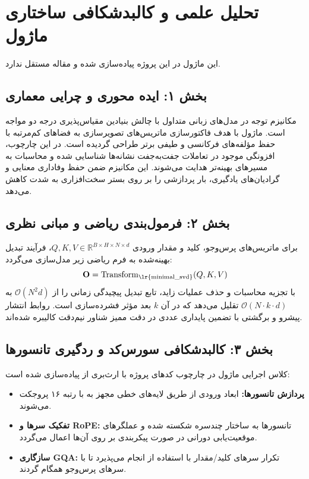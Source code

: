 \section{تحلیل علمی و کالبدشکافی ساختاری ماژول }

این ماژول در این پروژه پیاده‌سازی شده و مقاله مستقل ندارد.
\label{sec:minimal_svd}

\subsection*{بخش ۱: ایده محوری و چرایی معماری }
مکانیزم توجه در مدل‌های زبانی متداول با چالش بنیادین مقیاس‌پذیری درجه دو مواجه است. ماژول  با هدف فاکتورسازی ماتریس‌های تصویرسازی به فضاهای کم‌مرتبه با حفظ مؤلفه‌های فرکانسی و طیفی برتر طراحی گردیده است. در این چارچوب، افزونگی موجود در تعاملات جفت‌به‌جفت نشانه‌ها شناسایی شده و محاسبات به مسیرهای بهینه‌تر هدایت می‌شوند. این مکانیزم ضمن حفظ وفاداری معنایی و گرادیان‌های یادگیری، بار پردازشی را بر روی بستر سخت‌افزاری به شدت کاهش می‌دهد.

\subsection*{بخش ۲: فرمول‌بندی ریاضی و مبانی نظری }
برای ماتریس‌های پرس‌وجو، کلید و مقدار ورودی $Q, K, V \in \mathbb{R}^{B \times H \times N \times d}$، فرآیند تبدیل بهینه‌شده به فرم ریاضی زیر مدل‌سازی می‌گردد:
\begin{equation}
\mathbf{O} = \operatorname{Transform}_{\text{\lr{minimal\_svd}}}(Q, K, V)
\end{equation}
با تجزیه محاسبات و حذف عملیات زاید، تابع تبدیل پیچیدگی زمانی را از $\mathcal{O}(N^2 d)$ به $\mathcal{O}(N \cdot k \cdot d)$ تقلیل می‌دهد که در آن $k$ بعد مؤثر فشرده‌سازی است. روابط انتشار پیشرو و برگشتی با تضمین پایداری عددی در دقت ممیز شناور نیم‌دقت  کالیبره شده‌اند.

\subsection*{بخش ۳: کالبدشکافی سورس‌کد و ردگیری تانسورها }
کلاس اجرایی ماژول در چارچوب کدهای پروژه با ارث‌بری از  پیاده‌سازی شده است:
\begin{itemize}
    \item \textbf{پردازش تانسورها:} ابعاد ورودی \lr{$[B, N, D]$} از طریق لایه‌های خطی مجهز به  با رتبه ۱۶ پروجکت می‌شوند.
    \item \textbf{تفکیک سرها و RoPE:} تانسورها به ساختار چندسره \lr{$[B, H, N, d]$} شکسته شده و عملگرهای موقعیت‌یابی دورانی در صورت پیکربندی بر روی آن‌ها اعمال می‌گردد.
    \item \textbf{سازگاری GQA:} تکرار سرهای کلید/مقدار با استفاده از  انجام می‌پذیرد تا با سرهای پرس‌وجو همگام گردند.
\end{itemize}

